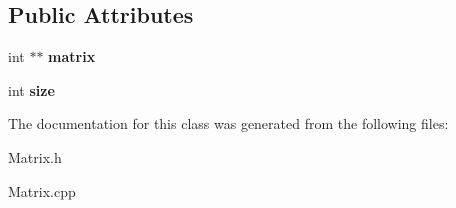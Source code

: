 \subsection*{Public Attributes}
\begin{DoxyCompactItemize}
\item 
\hypertarget{class_matrix_a0df8ee2a361c4d678fcde2fcf3a8e4f9}{int $\ast$$\ast$ {\bfseries matrix}}\label{class_matrix_a0df8ee2a361c4d678fcde2fcf3a8e4f9}

\item 
\hypertarget{class_matrix_acd4947d87d17f777df33e32cef2e873c}{int {\bfseries size}}\label{class_matrix_acd4947d87d17f777df33e32cef2e873c}

\end{DoxyCompactItemize}


The documentation for this class was generated from the following files\+:\begin{DoxyCompactItemize}
\item 
Matrix.\+h\item 
Matrix.\+cpp\end{DoxyCompactItemize}
